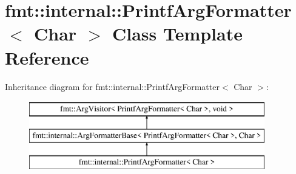 \hypertarget{classfmt_1_1internal_1_1PrintfArgFormatter}{}\section{fmt\+:\+:internal\+:\+:Printf\+Arg\+Formatter$<$ Char $>$ Class Template Reference}
\label{classfmt_1_1internal_1_1PrintfArgFormatter}
Inheritance diagram for fmt\+:\+:internal\+:\+:Printf\+Arg\+Formatter$<$ Char $>$\+:\begin{figure}[H]
\begin{center}
\leavevmode
\includegraphics[height=3.000000cm]{classfmt_1_1internal_1_1PrintfArgFormatter}
\end{center}
\end{figure}
